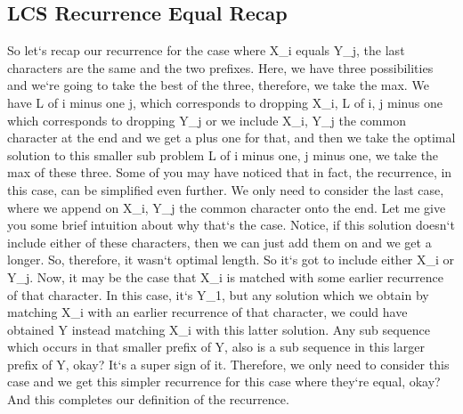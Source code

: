 \subsection{LCS  Recurrence Equal Recap}
So let`s recap our recurrence for the case where X\_i equals Y\_j, the last characters are the same and the two prefixes.
Here, we have three possibilities and we`re going to take the best of the three, therefore, we take the max.
We have L of i minus one j, which corresponds to dropping X\_i, L of i, j minus one which corresponds to dropping Y\_j or we include X\_i, Y\_j the common character at the end and we get a plus one for that, and then we take the optimal solution to this smaller sub problem L of i minus one, j minus one, we take the max of these three.
Some of you may have noticed that in fact, the recurrence, in this case, can be simplified even further.
We only need to consider the last case, where we append on X\_i, Y\_j the common character onto the end.
Let me give you some brief intuition about why that`s the case.
Notice, if this solution doesn`t include either of these characters, then we can just add them on and we get a longer.
So, therefore, it wasn`t optimal length.
So it`s got to include either X\_i or Y\_j.
Now, it may be the case that X\_i is matched with some earlier recurrence of that character.
In this case, it`s Y\_1, but any solution which we obtain by matching X\_i with an earlier recurrence of that character, we could have obtained Y instead matching X\_i with this latter solution.
Any sub sequence which occurs in that smaller prefix of Y, also is a sub sequence in this larger prefix of Y, okay? It`s a super sign of it.
Therefore, we only need to consider this case and we get this simpler recurrence for this case where they`re equal, okay? And this completes our definition of the recurrence.

